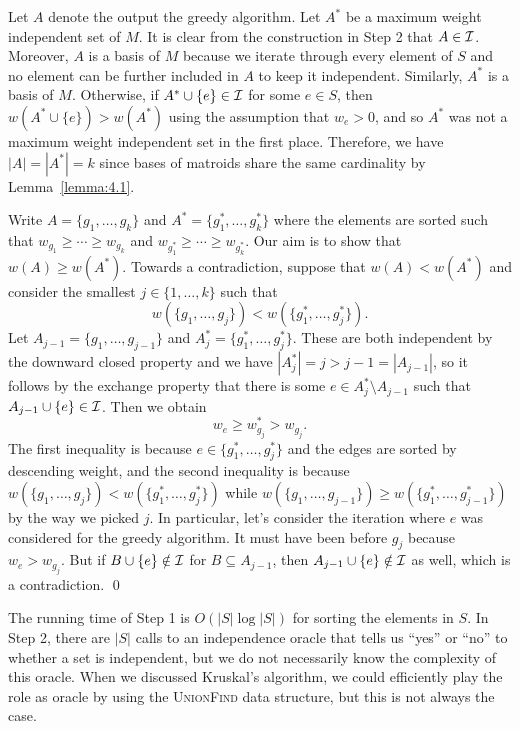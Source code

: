\begin{pf}
    Let $A$ denote the output the greedy algorithm. Let $A^*$ be a 
    maximum weight independent set of $M$. It is clear from the construction 
    in Step 2 that $A \in {\cal I}$. Moreover, $A$ is a basis of $M$ 
    because we iterate through every element of $S$ and no element 
    can be further included in $A$ to keep it independent. Similarly, 
    $A^*$ is a basis of $M$. Otherwise, if $A^* \cup \{e\} \in {\cal I}$ 
    for some $e \in S$, then $w(A^* \cup \{e\}) > w(A^*)$ using the 
    assumption that $w_e > 0$, and so $A^*$ was not a maximum weight 
    independent set in the first place. Therefore, we have $|A| = |A^*| = k$ 
    since bases of matroids share the same cardinality by Lemma~\ref{lemma:4.1}.

    Write $A = \{g_1, \dots, g_k\}$ and $A^* = \{g_1^*, \dots, g_k^*\}$ 
    where the elements are sorted such that $w_{g_1} \geq \cdots \geq 
    w_{g_k}$ and $w_{g_1^*} \geq \cdots \geq w_{g_k^*}$. Our aim is to show 
    that $w(A) \geq w(A^*)$. Towards a contradiction, suppose that 
    $w(A) < w(A^*)$ and consider the smallest $j \in \{1, \dots, k\}$ such that 
    \[ w(\{g_1, \dots, g_j\}) < w(\{g_1^*, \dots, g_j^*\}). \] 
    Let $A_{j-1} = \{g_1, \dots, g_{j-1}\}$ and $A_j^* = \{g_1^*, \dots, g_j^*\}$. 
    These are both independent by the downward closed property and we have 
    $|A_j^*| = j > j-1 = |A_{j-1}|$, so it follows by the exchange property 
    that there is some $e \in A_j^* \setminus A_{j-1}$ such that $A_{j-1} 
    \cup \{e\} \in {\cal I}$. Then we obtain 
    \[ w_e \geq w_{g_j}^* > w_{g_j}. \] 
    The first inequality is because $e \in \{g_1^*, \dots, g_j^*\}$ and 
    the edges are sorted by descending weight, and the second inequality 
    is because $w(\{g_1, \dots, g_j\}) < w(\{g_1^*, \dots, g_j^*\})$ 
    while $w(\{g_1, \dots, g_{j-1}\}) \geq w(\{g_1^*, \dots, g_{j-1}^*\})$
    by the way we picked $j$. In particular, let's consider the iteration 
    where $e$ was considered for the greedy algorithm. It must have been 
    before $g_j$ because $w_e > w_{g_j}$. But if $B \cup \{e\} 
    \notin {\cal I}$ for $B \subseteq A_{j-1}$, then $A_{j-1} 
    \cup \{e\} \notin {\cal I}$ as well, which is a contradiction. \qed
\end{pf}\vspace{-0.25cm}

The running time of Step 1 is $O(|S|\log|S|)$ for sorting the elements in $S$. 
In Step 2, there are $|S|$ calls to an independence oracle that tells us 
``yes'' or ``no'' to whether a set is independent, but we do not 
necessarily know the complexity of this oracle. When we discussed Kruskal's 
algorithm, we could efficiently play the role as oracle by using the \textsc{UnionFind} 
data structure, but this is not always the case.

